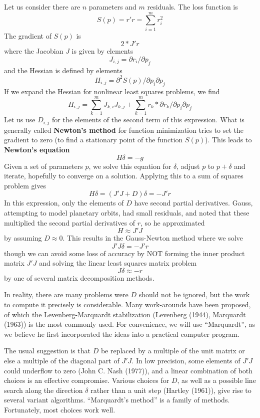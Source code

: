Let us consider there are \(n\) parameters and \(m\) residuals.
The loss function is
\[ S(p) = r' r = \sum_{i=1}^m { r_i^2 }\]
The gradient of \(S(p)\) is
\[ 2 * J' r\]
where the Jacobian \(J\) is given by elements
\[ J_{i,j} = \partial r_i / \partial p_j \]
and the Hessian is defined by elements
\[ H_{i,j} = \partial ^2 S(p) / {\partial p_i \partial p_j} \]
If we expand the Hessian for nonlinear least squares problems, we find
\[  H_{i,j} = \sum_{k = 1}^m{ J_{k,i} J_{k,j}}  + \sum_{k = 1}^m {r_k * \partial{r_k}/{\partial p_i \partial p_j}}\]
Let us use \(D_{i,j}\) for the elements of the second term of this expression.
What is generally called \textbf{Newton's method} for function minimization tries
to set the gradient to zero (to find a stationary point of the function \(S(p)\)).
This leads to \textbf{Newton's equation}
\[ H \delta = -g \]
Given a set of parameters \(p\), we solve this equation for \(\delta\), adjust \(p\)
to \(p + \delta\) and iterate, hopefully to converge on a solution.
Applying this to a sum of squares problem gives
\[ H \delta = (J'J + D) \delta = - J' r\]
In this expression, only the elements of \(D\) have second partial derivatives.
Gauss, attempting to model planetary orbits, had small residuals, and noted
that these multiplied the second partial derivatives of \(r\), so he approximated
\[ H \approx J' J\]
by assuming \(D \approx 0\). This results in the Gauss-Newton method where we
solve
\[ J' J \delta = - J' r\]
though we can avoid some loss of accuracy by NOT forming the inner product matrix
\(J' J\) and solving the linear least squares matrix problem
\[ J \delta \approx -r \]
by one of several matrix decomposition methods.

In reality, there are many problems were \(D\) should not be ignored, but the work
to compute it precisely is considerable. Many work-arounds have been
proposed, of which the Levenberg-Marquardt stabilization
(Levenberg (1944), Marquardt (1963)) is
the most commonly used. For convenience, we will use ``Marquardt'', as we believe he
first incorporated the ideas into a practical computer program.

The usual suggestion is that \(D\) be replaced by a multiple of the unit matrix or else
a multiple of the diagonal part of \(J' J\). In low precision, some elements of
\(J' J\) could underflow to zero (John C. Nash (1977)), and a linear combination of both
choices is an effective compromise. Various choices for
\(D\), as well as a possible line search along the
direction \(\delta\) rather than a unit step (Hartley (1961)),
give rise to several variant
algorithms. ``Marquardt's method'' is a family of methods. Fortunately, most choices
work well.

